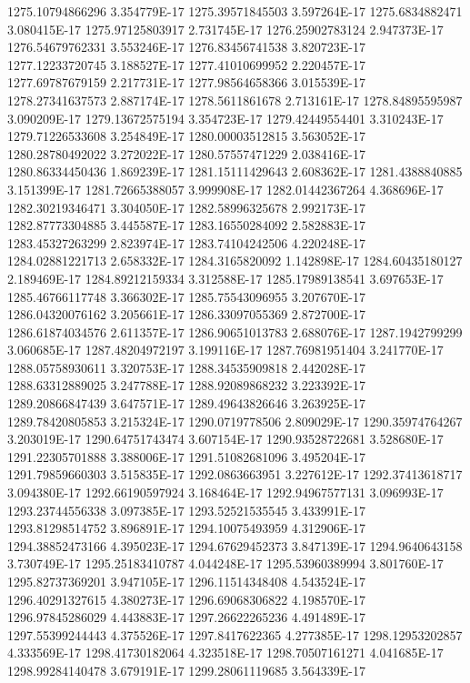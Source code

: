 1275.10794866296  3.354779E-17
1275.39571845503  3.597264E-17
1275.6834882471  3.080415E-17
1275.97125803917  2.731745E-17
1276.25902783124  2.947373E-17
1276.54679762331  3.553246E-17
1276.83456741538  3.820723E-17
1277.12233720745  3.188527E-17
1277.41010699952  2.220457E-17
1277.69787679159  2.217731E-17
1277.98564658366  3.015539E-17
1278.27341637573  2.887174E-17
1278.5611861678  2.713161E-17
1278.84895595987  3.090209E-17
1279.13672575194  3.354723E-17
1279.42449554401  3.310243E-17
1279.71226533608  3.254849E-17
1280.00003512815  3.563052E-17
1280.28780492022  3.272022E-17
1280.57557471229  2.038416E-17
1280.86334450436  1.869239E-17
1281.15111429643  2.608362E-17
1281.4388840885  3.151399E-17
1281.72665388057  3.999908E-17
1282.01442367264  4.368696E-17
1282.30219346471  3.304050E-17
1282.58996325678  2.992173E-17
1282.87773304885  3.445587E-17
1283.16550284092  2.582883E-17
1283.45327263299  2.823974E-17
1283.74104242506  4.220248E-17
1284.02881221713  2.658332E-17
1284.3165820092  1.142898E-17
1284.60435180127  2.189469E-17
1284.89212159334  3.312588E-17
1285.17989138541  3.697653E-17
1285.46766117748  3.366302E-17
1285.75543096955  3.207670E-17
1286.04320076162  3.205661E-17
1286.33097055369  2.872700E-17
1286.61874034576  2.611357E-17
1286.90651013783  2.688076E-17
1287.1942799299  3.060685E-17
1287.48204972197  3.199116E-17
1287.76981951404  3.241770E-17
1288.05758930611  3.320753E-17
1288.34535909818  2.442028E-17
1288.63312889025  3.247788E-17
1288.92089868232  3.223392E-17
1289.20866847439  3.647571E-17
1289.49643826646  3.263925E-17
1289.78420805853  3.215324E-17
1290.0719778506  2.809029E-17
1290.35974764267  3.203019E-17
1290.64751743474  3.607154E-17
1290.93528722681  3.528680E-17
1291.22305701888  3.388006E-17
1291.51082681096  3.495204E-17
1291.79859660303  3.515835E-17
1292.0863663951  3.227612E-17
1292.37413618717  3.094380E-17
1292.66190597924  3.168464E-17
1292.94967577131  3.096993E-17
1293.23744556338  3.097385E-17
1293.52521535545  3.433991E-17
1293.81298514752  3.896891E-17
1294.10075493959  4.312906E-17
1294.38852473166  4.395023E-17
1294.67629452373  3.847139E-17
1294.9640643158  3.730749E-17
1295.25183410787  4.044248E-17
1295.53960389994  3.801760E-17
1295.82737369201  3.947105E-17
1296.11514348408  4.543524E-17
1296.40291327615  4.380273E-17
1296.69068306822  4.198570E-17
1296.97845286029  4.443883E-17
1297.26622265236  4.491489E-17
1297.55399244443  4.375526E-17
1297.8417622365  4.277385E-17
1298.12953202857  4.333569E-17
1298.41730182064  4.323518E-17
1298.70507161271  4.041685E-17
1298.99284140478  3.679191E-17
1299.28061119685  3.564339E-17
